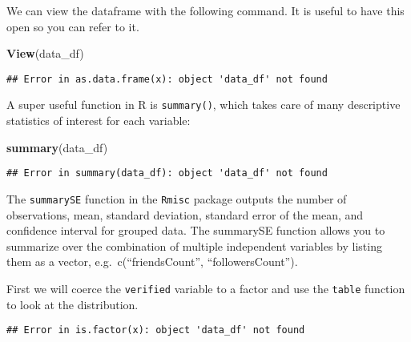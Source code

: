 \documentclass[]{article}
\newenvironment{Shaded}{\begin{snugshade}}{\end{snugshade}}
\newcommand{\KeywordTok}[1]{\textcolor[rgb]{0.13,0.29,0.53}{\textbf{#1}}}
\newcommand{\NormalTok}[1]{#1}
\newcommand{\OperatorTok}[1]{\textcolor[rgb]{0.81,0.36,0.00}{\textbf{#1}}}
\newcommand{\StringTok}[1]{\textcolor[rgb]{0.31,0.60,0.02}{#1}}
\begin{document}
We can view the dataframe with the following command. It is useful to
have this open so you can refer to it.

\begin{Shaded}
\begin{Highlighting}[]
\KeywordTok{View}\NormalTok{(data_df)}
\end{Highlighting}
\end{Shaded}

\begin{verbatim}
## Error in as.data.frame(x): object 'data_df' not found
\end{verbatim}

A super useful function in R is \texttt{summary()}, which takes care of
many descriptive statistics of interest for each variable:

\begin{Shaded}
\begin{Highlighting}[]
\KeywordTok{summary}\NormalTok{(data_df)}
\end{Highlighting}
\end{Shaded}

\begin{verbatim}
## Error in summary(data_df): object 'data_df' not found
\end{verbatim}

The \texttt{summarySE} function in the \texttt{Rmisc} package outputs
the number of observations, mean, standard deviation, standard error of
the mean, and confidence interval for grouped data. The summarySE
function allows you to summarize over the combination of multiple
independent variables by listing them as a vector,
e.g.~c(``friendsCount'', ``followersCount'').

First we will coerce the \texttt{verified} variable to a factor and use
the \texttt{table} function to look at the distribution.

\begin{Shaded}
\end{Shaded}

\begin{verbatim}
## Error in is.factor(x): object 'data_df' not found
\end{verbatim}

\begin{Shaded}
\end{Shaded}
\end{document}
